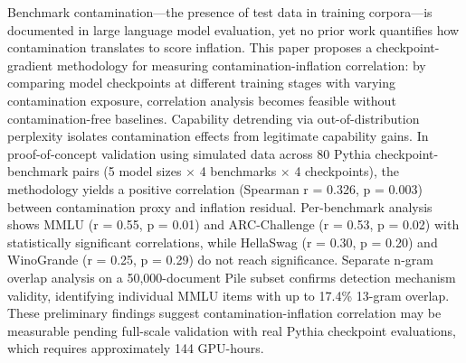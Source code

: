 
Benchmark contamination---the presence of test data in training corpora---is documented in large language model evaluation, yet no prior work quantifies how contamination translates to score inflation. This paper proposes a checkpoint-gradient methodology for measuring contamination-inflation correlation: by comparing model checkpoints at different training stages with varying contamination exposure, correlation analysis becomes feasible without contamination-free baselines. Capability detrending via out-of-distribution perplexity isolates contamination effects from legitimate capability gains. In proof-of-concept validation using simulated data across 80 Pythia checkpoint-benchmark pairs (5 model sizes $\times$ 4 benchmarks $\times$ 4 checkpoints), the methodology yields a positive correlation (Spearman r = 0.326, p = 0.003) between contamination proxy and inflation residual. Per-benchmark analysis shows MMLU (r = 0.55, p = 0.01) and ARC-Challenge (r = 0.53, p = 0.02) with statistically significant correlations, while HellaSwag (r = 0.30, p = 0.20) and WinoGrande (r = 0.25, p = 0.29) do not reach significance. Separate n-gram overlap analysis on a 50,000-document Pile subset confirms detection mechanism validity, identifying individual MMLU items with up to 17.4\% 13-gram overlap. These preliminary findings suggest contamination-inflation correlation may be measurable pending full-scale validation with real Pythia checkpoint evaluations, which requires approximately 144 GPU-hours.

